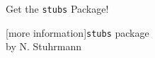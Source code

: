 \documentclass[a4paper]{article}
\begin{document}
\begin{center}
 \Huge Get the {\tt stubs} Package!
\end{center}

\stubs[15]{3cm}[more information]{{{\tt stubs} package}\\by N. Stuhrmann}
 
\end{document}
